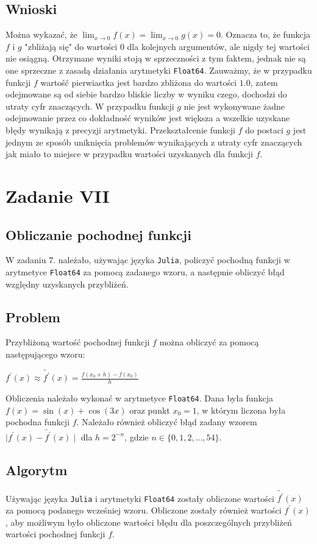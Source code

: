 \documentclass{article}
\begin{document}
\subsection{Wnioski}
Można wykazać, że $ \lim_{x \to 0} f(x) = \lim_{x \to 0} g(x) = 0 $. Oznacza to, że funkcja $f$ i $g$ "zbliżają się" do wartości $0$ dla kolejnych argumentów, ale nigdy tej wartości nie osiągną. Otrzymane wyniki stoją w sprzeczności z tym faktem, jednak nie są one sprzeczne z zasadą działania arytmetyki \texttt{Float64}. Zauważmy, że w przypadku funkcji $f$ wartość pierwiastka jest bardzo zbliżona do wartości $1.0$, zatem odejmowane są od siebie bardzo bliskie liczby w wyniku czego, dochodzi do utraty cyfr znaczących. W przypadku funkcji $g$ nie jest wykonywane żadne odejmowanie przez co dokładność wyników jest większa a wszelkie uzyskane błędy wynikają z precyzji arytmetyki. Przekształcenie funkcji $f$ do postaci $g$ jest jednym ze sposób uniknięcia problemów wynikających z utraty cyfr znaczących jak miało to miejsce w przypadku wartości uzyskanych dla funkcji $f$.

\section{Zadanie VII}

\subsection{Obliczanie pochodnej funkcji}
W zadaniu 7. należało, używając języka \texttt{Julia}, policzyć pochodną funkcji w arytmetyce \texttt{Float64} za pomocą zadanego wzoru, a następnie obliczyć błąd względny uzyskanych przybliżeń.

\subsection{Problem}
Przybliżoną wartość pochodnej funkcji $f$ można obliczyć za pomocą następującego wzoru:
\begin{center}
    $f^{'}(x) \approx \tilde{f^{'}}(x) = \frac{f(x_{0} + h) - f(x_{0})}{h}$
\end{center}
Obliczenia należało wykonać w arytmetyce \texttt{Float64}. Dana była funkcja $f(x) = \sin(x) + \cos(3x)$ oraz punkt $x_{0} = 1$, w którym liczona była pochodna funkcji $f$. Należało również obliczyć błąd zadany wzorem $\mid f^{'}(x) - \tilde{f^{'}}(x) \mid$ dla $h = 2^{-n}$, gdzie $n \in \lbrace 0, 1, 2, ..., 54 \rbrace$.

\subsection{Algorytm}
Używając języka \texttt{Julia} i arytmetyki \texttt{Float64} zostały obliczone wartości $\tilde{f^{'}}(x)$ za pomocą podanego wcześniej wzoru. Obliczone zostały również wartości $f^{'}(x)$, aby możliwym było obliczone wartości błędu dla poszczególnych przybliżeń wartości pochodnej funkcji $f$.
\end{document}
